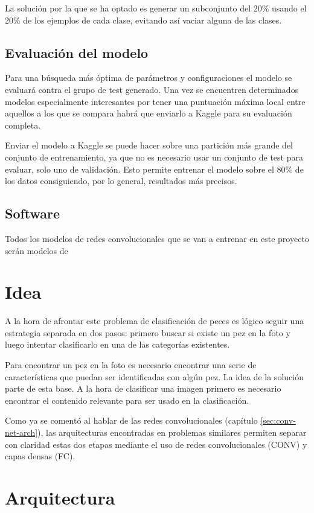 La solución por la que se ha optado es generar un subconjunto del 20\% usando el 20\% de los ejemplos de cada clase, evitando así vaciar alguna de las clases.

\subsection{Evaluación del modelo}

Para una búsqueda más óptima de parámetros y configuraciones el modelo se evaluará contra el grupo de test generado. Una vez se encuentren determinados modelos especialmente interesantes por tener una puntuación máxima local entre aquellos a los que se compara habrá que enviarlo a Kaggle para su evaluación completa.

Enviar el modelo a Kaggle se puede hacer sobre una partición más grande del conjunto de entrenamiento, ya que no es necesario usar un conjunto de test para evaluar, solo uno de validación. Esto permite entrenar el modelo sobre el 80\% de los datos consiguiendo, por lo general, resultados más precisos.

\subsection{Software}

Todos los modelos de redes convolucionales que se van a entrenar en este proyecto serán modelos de 
\section{Idea}
A la hora de afrontar este problema de clasificación de peces es lógico
seguir una estrategia separada en dos pasos: primero buscar si
existe un pez en la foto y luego intentar clasificarlo en una de las 
categorías existentes. 

Para encontrar un pez en la foto es necesario encontrar una serie de
características que puedan ser identificadas con algún pez. La idea de 
la solución parte de esta base. A la hora de clasificar una imagen
primero es necesario encontrar el contenido relevante para ser usado
en la clasificación.

Como ya se comentó al hablar de las redes convolucionales (capítulo \ref{sec:conv-net-arch}),
las arquitecturas encontradas en problemas similares \parencite{krizhevsky2012imagenet}
permiten separar con claridad estas dos etapas mediante el uso de redes convolucionales (CONV) y capas densas (FC).

\section{Arquitectura}

